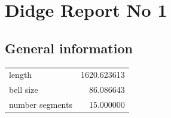 \documentclass{article}
\begin{document}
\begin{centering}
\begin{figure}[!htb]
\end{figure}
\end{centering}
\section{Didge Report No 1}

\subsection{General information}
\begin{centering}

\begin{figure}[!htb]
\end{figure}
\begin{tabular}{lr}
\toprule
         length & 1620.623613 \\
      bell size &   86.086643 \\
number segments &   15.000000 \\
\bottomrule
\end{tabular}
\end{centering}
\end{document}
